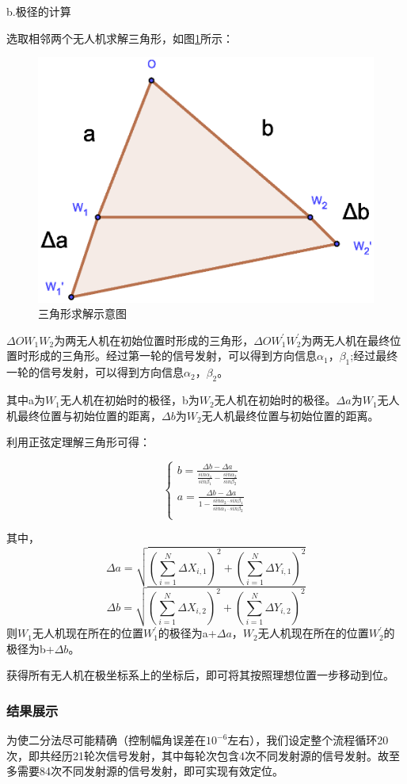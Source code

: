 \documentclass{ctexart}
\begin{document}
b.极径的计算

选取相邻两个无人机求解三角形，如图\ref{三角形求解示意图}所示：


\begin{figure}[H]
  \centering
  \includegraphics[width=0.45\linewidth]{pic/solution.eps}
  \caption{三角形求解示意图}
  \label{三角形求解示意图}
  \end{figure}



$\Delta OW_1W_2$为两无人机在初始位置时形成的三角形，$\Delta OW_1^{'}W_2^{'}$为两无人机在最终位置时形成的三角形。经过第一轮的信号发射，可以得到方向信息$\alpha_1$，$\beta_1$;经过最终一轮的信号发射，可以得到方向信息$\alpha_2$，$\beta_2$。

其中a为$W_1$无人机在初始时的极径，b为$W_2$无人机在初始时的极径。$\Delta a$为$W_1$无人机最终位置与初始位置的距离，$\Delta b$为$W_2$无人机最终位置与初始位置的距离。

利用正弦定理解三角形可得：

\begin{equation}
  \left\{
            \begin{array}{ll}
              b=\frac{\Delta b-\Delta a}{\frac{sin\alpha_1}{sin\beta_1}-\frac{sin\alpha_2}{sin\beta_2}}\\
              a=\frac{\Delta b-\Delta a}{1-\frac{sin\alpha_2\cdot sin\beta_1}{sin\alpha_1\cdot sin\beta_2}}\\


            \end{array}
          \right.
\end{equation}

其中，
\[
  \Delta a=\sqrt{(\sum_{i=1}^{N}\Delta X_{i,1})^2+(\sum_{i=1}^{N}\Delta Y_{i,1})^2}
\]
\[
  \Delta b=\sqrt{(\sum_{i=1}^{N}\Delta X_{i,2})^2+(\sum_{i=1}^{N}\Delta Y_{i,2})^2}
\]
则$W_1$无人机现在所在的位置$W_1^{'}$的极径为a+$\Delta a$，$W_2$无人机现在所在的位置$W_2^{'}$的极径为b+$\Delta b$。

获得所有无人机在极坐标系上的坐标后，即可将其按照理想位置一步移动到位。
\subsubsection{结果展示}
为使二分法尽可能精确（控制幅角误差在$10^{-6}$左右），我们设定整个流程循环20次，即共经历21轮次信号发射，其中每轮次包含4次不同发射源的信号发射。故至多需要84次不同发射源的信号发射，即可实现有效定位。
\end{document}
